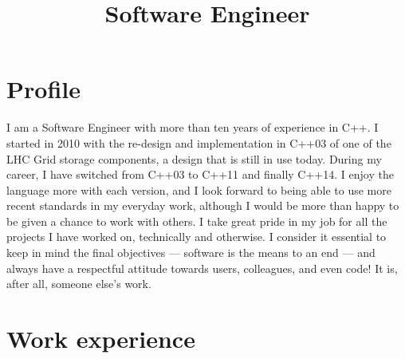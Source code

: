 \documentclass[11pt,a4paper]{moderncv}
\title{Software Engineer}
\begin{document}
\maketitle


\section{Profile}
I am a Software Engineer with more than ten years of experience in C++.
I started in 2010 with the re-design and implementation in C++03 of one of the LHC Grid storage components,
a design that is still in use today. During my career, I have switched from C++03 to C++11 and finally C++14.
I enjoy the language more with each version, and I look forward to being able to use more recent standards in
my everyday work, although I would be more than happy to be given a chance to work with others.
I take great pride in my job for all the projects I have worked on, technically and otherwise.
I consider it essential to keep in mind the final objectives --- software is the means to an end ---
and always have a respectful attitude towards users, colleagues, and even code!
It is, after all, someone else's work.


\section{Work experience}
\end{document}

